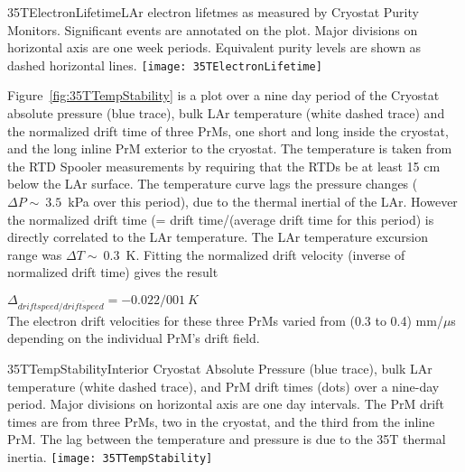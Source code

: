 \begin{cdrfigure}{35TElectronLifetime}{LAr electron lifetmes as measured by 
Cryostat Purity Monitors. Significant events are annotated on the plot. Major divisions on horizontal axis 
are one week periods. Equivalent purity levels are shown as dashed horizontal lines.}
  \texttt{[image: 35TElectronLifetime]}
\end{cdrfigure}

Figure~\ref{fig:35TTempStability} is a plot over a nine day period of the Cryostat absolute pressure (blue 
trace), bulk LAr temperature (white dashed trace) and the normalized drift time of three PrMs, one short 
and long inside the cryostat, and the long inline PrM exterior to the cryostat. The temperature is taken 
from the RTD Spooler measurements by requiring that the RTDs be at least 15 cm below the LAr surface. 
The temperature curve lags the pressure changes ($\Delta P \sim~3.5$~kPa over this period), due to the thermal 
inertial of the LAr. However the normalized drift time (= drift time/(average drift time for this period) is 
directly correlated to the LAr temperature. The LAr temperature excursion range was $\Delta T \sim~0.3$~K. 
Fitting the normalized drift velocity (inverse of normalized drift time) gives the result 


 $\Delta_{driftspeed/\overline{driftspeed}} = -0.022/001~K$\\
 
The electron drift velocities for these three PrMs varied from (0.3 to 0.4) mm/$\mu$s depending on the individual PrM's drift field. 

\begin{cdrfigure}{35TTempStability}{Interior Cryostat Absolute Pressure 
(blue trace), bulk LAr temperature (white dashed trace), and PrM drift times (dots) over a nine-day period. 
Major divisions on horizontal axis are one day intervals. The PrM drift times are from three PrMs, two in 
the cryostat, and the third from the inline PrM. The lag between the temperature and pressure is due to 
the 35T thermal inertia.}
  \texttt{[image: 35TTempStability]}
\end{cdrfigure}

